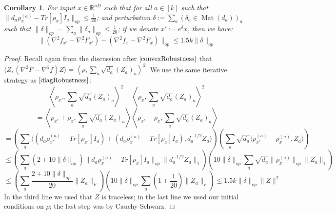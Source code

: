 \documentclass{article}
\newtheorem{corollary}[theorem]{Corollary}
\newcommand{\R}{{\mathbb{R}}}
\newcommand{\mat}{\operatorname{Mat}}
\newcommand\samp{x}
\newcommand{\CF}[1]{{\color{purple}[CF: #1]}}
\newcommand{\AR}[1]{{\color{orange}[AR: #1]}}
\begin{document}
\begin{corollary} \label{rankoneRobustness}
For input $x \in \R^{nD}$ such that for all $a \in [k]$ such that $\|d_{a} \rho_{\samp}^{(a)} - Tr[\rho_{\samp}] I_{a}\|_{op} \leq \frac{1}{20}$; and perturbation $\delta := \sum_{a} (\delta_{a} \in \mat(d_{a}))_{a}$ such that $\|\delta\|_{op} = \sum_{a} \|\delta_{a}\|_{op} \leq \frac{1}{20}$; if we denote $\samp' := e^{\delta} \samp$, then we have:
\[ \|(\nabla^{2} f_{\samp'} - \nabla^{2} F_{\samp'}) - (\nabla^{2} f_{\samp} - \nabla^{2} F_{\samp})\|_{op} \leq 1.5 k \|\delta\|_{op}     \]
\end{corollary}
\begin{proof}
Recall again from the discussion after $\ref{convexRobustness}$ that $\langle Z, (\nabla^{2} F - \nabla^{2} f) Z \rangle = \left\langle \rho, \sum_{a} \sqrt{d_{a}} (Z_{a})_{a}  \right\rangle^{2}$. We use the same iterative strategy as $\ref{diagRobustness}$:
\[    \left\langle \rho_{\samp'}, \sum_{a} \sqrt{d_{a}} (Z_{a})_{a}  \right\rangle^{2} -  \left\langle \rho_{\samp}, \sum_{a} \sqrt{d_{a}} (Z_{a})_{a}  \right\rangle^{2}    \]
\[ = \left\langle \rho_{\samp'} + \rho_{\samp}, \sum_{a} \sqrt{d_{a}} (Z_{a})_{a}  \right\rangle \left\langle \rho_{\samp'} - \rho_{\samp}, \sum_{a} \sqrt{d_{a}} (Z_{a})_{a}  \right\rangle  \]
\[ = \left( \sum_{a} \langle (d_{a} \rho_{\samp'}^{(a)} - Tr[\rho_{\samp'}] I_{a}) + (d_{a} \rho_{\samp}^{(a)} - Tr[\rho_{\samp}] I_{a}) , d_{a}^{-1/2} Z_{a} \rangle \right) \left( \sum_{a} \sqrt{d_{a}} \langle \rho_{\samp'}^{(a)} - \rho_{\samp}^{(a)}, Z_{a} \rangle \right)     \]
\[ \leq \left( \sum_{a} (2 + 10 \|\delta\|_{op}) \|d_{a} \rho_{\samp}^{(a)} - Tr[\rho_{\samp}] I_{a} \|_{op} \|d_{a}^{-1/2} Z_{a}\|_{1}   \right) 
\left( 10\|\delta\|_{op} \sum_{a} \sqrt{d_{a}} \| \rho_{\samp}^{(a)}\|_{op} \|Z_{a}\|_{1}   \right)    \]
\[ \leq \left( \sum_{a} \frac{2 + 10 \|\delta\|_{op}}{20} \|Z_{a}\|_{F}  \right) 
\left( 10\|\delta\|_{op} \sum_{a} (1 + \frac{1}{20}) \|Z_{a}\|_{F} \right) 
\leq 1.5 k \|\delta\|_{op} \|Z\|^{2}      \]
In the third line we used that $Z$ is traceless; in the last line we used our initial conditions on $\rho$; the last step was by Cauchy-Schwarz. 
\end{proof}
\end{document}
